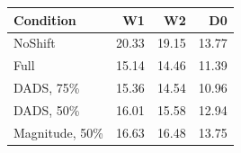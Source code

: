 \begin{tabular}{lrrr}
\toprule
Condition & W1 & W2 & D0\\
\midrule
NoShift & 20.33 & 19.15 & 13.77\\
Full & 15.14 & 14.46 & 11.39\\
DADS, 75\% & 15.36 & 14.54 & 10.96\\
DADS, 50\% & 16.01 & 15.58 & 12.94\\
Magnitude, 50\% & 16.63 & 16.48 & 13.75\\
\bottomrule
\end{tabular}
